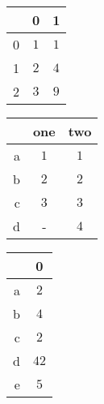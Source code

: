 \begin{table}[htp]
	\begin{center}
		\begin{tabular}{rcc}
		\toprule
                {} & {0} & {1}\\
                \midrule
                {0} & $1$ & $1$\\
                {1} & $2$ & $4$\\
                {2} & $3$ & $9$\\
		\bottomrule
		\end{tabular}
	\end{center}
\end{table}
\begin{table}[htp]
	\begin{center}
		\begin{tabular}{rcc}
		\toprule
			{} & {one} & {two}\\
			\midrule
			{a} & $1$ & $1$\\
			{b} & $2$ & $2$\\
			{c} & $3$ & $3$\\
			{d} & {-} & $4$\\
		\bottomrule
		\end{tabular}
	\end{center}
\end{table}
\begin{table}[htp]
	\begin{center}
		\begin{tabular}{rc}
		\toprule
			{} & {0}\\
			\midrule
			{a} & $2$\\
			{b} & $4$\\
			{c} & $2$\\
			{d} & $42$\\
			{e} & $5$\\
		\bottomrule
		\end{tabular}
	\end{center}
\end{table}